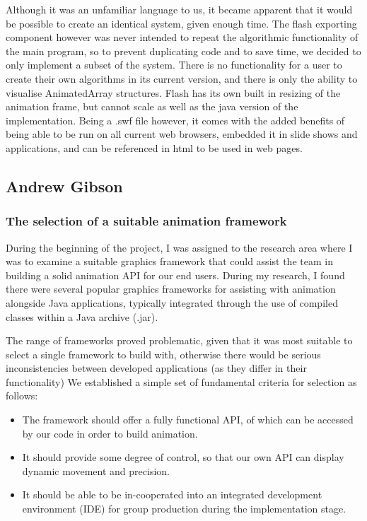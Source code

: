 \documentclass{l3proj}
\begin{document}
\begin{itemize}
Although it was an unfamiliar language to us, it became apparent that it would be possible to create an identical system, given enough time. The flash exporting component however was never intended to repeat the algorithmic functionality of the main program, so to prevent duplicating code and to save time, we decided to only implement a subset of the system. There is no functionality for a user to create their own algorithms in its current version, and there is only the ability to visualise AnimatedArray structures. Flash has its own built in resizing of the animation frame, but cannot scale as well as the java version of the implementation. Being a .swf file however, it comes with the added benefits of being able to be run on all current web browsers, embedded it in slide shows and applications, and can be referenced in html to be used in web pages.
\end{itemize}

\subsection{Andrew Gibson}
\subsubsection{The selection of a suitable animation framework}

During the beginning of the project, I was assigned to the research area where I was to examine a suitable graphics framework that could assist the team in building a solid animation API for our end users. During my research, I found there were several popular graphics frameworks for assisting with animation alongside Java applications, typically integrated through the use of compiled classes within a Java archive (.jar).

The range of frameworks proved problematic, given that it was most suitable to select a single framework to build with, otherwise there would be serious inconsistencies between developed applications (as they differ in their functionality) We established a simple set of fundamental criteria for selection as follows:
\begin{itemize}
	\item The framework should offer a fully functional API, of which can be accessed by our code in order to build animation.
	\item It should provide some degree of control, so that our own API can display dynamic movement and precision.
	\item It should be able to be in-cooperated into an integrated development environment (IDE) for group production during the implementation stage.
\end{itemize}
\end{document}
